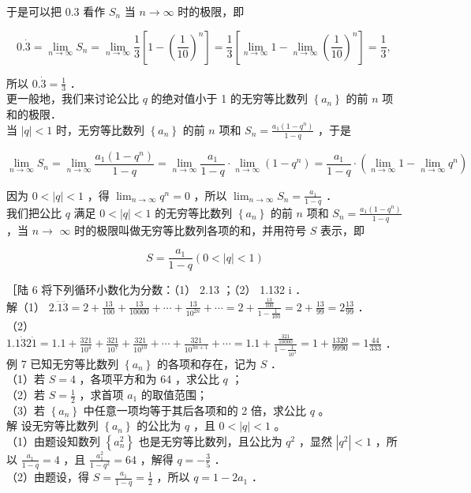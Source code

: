 \documentclass[10pt]{article}
\begin{document}
于是可以把 0.3 看作 \(S_{n}\) 当 \(n \rightarrow \infty\) 时的极限，即

\[
0 . \dot{3}=\lim _{n \rightarrow \infty} S_{n}=\lim _{n \rightarrow \infty} \frac{1}{3}\left[1-\left(\frac{1}{10}\right)^{n}\right]=\frac{1}{3}\left[\lim _{n \rightarrow \infty} 1-\lim _{n \rightarrow \infty}\left(\frac{1}{10}\right)^{n}\right]=\frac{1}{3} \text {, }
\]

所以 \(0 . \dot{3}=\frac{1}{3}\) ．\\
更一般地，我们来讨论公比 \(q\) 的绝对值小于 1 的无穷等比数列 \(\left\{a_{n}\right\}\) 的前 \(n\) 项和的极限．\\
当 \(|q|<1\) 时，无穷等比数列 \(\left\{a_{n}\right\}\) 的前 \(n\) 项和 \(S_{n}=\frac{a_{1}\left(1-q^{n}\right)}{1-q}\) ，于是

\[
\lim _{n \rightarrow \infty} S_{n}=\lim _{n \rightarrow \infty} \frac{a_{1}\left(1-q^{n}\right)}{1-q}=\lim _{n \rightarrow \infty} \frac{a_{1}}{1-q} \cdot \lim _{n \rightarrow \infty}\left(1-q^{n}\right)=\frac{a_{1}}{1-q} \cdot\left(\lim _{n \rightarrow \infty} 1-\lim _{n \rightarrow \infty} q^{n}\right)
\]

因为 \(0<|q|<1\) ，得 \(\lim _{n \rightarrow \infty} q^{n}=0\) ，所以 \(\lim _{n \rightarrow \infty} S_{n}=\frac{a_{1}}{1-q}\) ．\\
我们把公比 \(q\) 满足 \(0<|q|<1\) 的无穷等比数列 \(\left\{a_{n}\right\}\) 的前 \(n\) 项和 \(S_{n}=\frac{a_{1}\left(1-q^{n}\right)}{1-q}\) ，当 \(n \rightarrow\) \(\infty\) 时的极限叫做无穷等比数列各项的和，并用符号 \(S\) 表示，即

\[
S=\frac{a_{1}}{1-q}(0<|q|<1)
\]

［陆 6 将下列循环小数化为分数：（1） 2.13 ；（2） 1.132 i ．\\
解（1） \(2 . \ddot{1} \ddot{3}=2+\frac{13}{100}+\frac{13}{10000}+\cdots+\frac{13}{10^{2 n}}+\cdots=2+\frac{\frac{13}{100}}{1-\frac{1}{100}}=2+\frac{13}{99}=2 \frac{13}{99}\) ．\\
（2） \(1.1 \dot{3} 2 \dot{1}=1.1+\frac{321}{10^{4}}+\frac{321}{10^{7}}+\frac{321}{10^{10}}+\cdots+\frac{321}{10^{3 n+1}}+\cdots=1.1+\frac{\frac{321}{10000}}{1-\frac{1}{10^{3}}}=1+\frac{1320}{9990}=1 \frac{44}{333}\) ．\\
例 7 已知无穷等比数列 \(\left\{a_{n}\right\}\) 的各项和存在，记为 \(S\) ．\\
（1）若 \(S=4\) ，各项平方和为 64 ，求公比 \(q\) ；\\
（2）若 \(S=\frac{1}{2}\) ，求首项 \(a_{1}\) 的取值范围；\\
（3）若 \(\left\{a_{n}\right\}\) 中任意一项均等于其后各项和的 2 倍，求公比 \(q\) 。\\
解 设无穷等比数列 \(\left\{a_{n}\right\}\) 的公比为 \(q\) ，且 \(0<|q|<1\) 。\\
（1）由题设知数列 \(\left\{a_{n}^{2}\right\}\) 也是无穷等比数列，且公比为 \(q^{2}\) ，显然 \(\left|q^{2}\right|<1\) ，所以 \(\frac{a_{1}}{1-q}=4\) ，且 \(\frac{a_{1}^{2}}{1-q^{2}}=64\) ，解得 \(q=-\frac{3}{5}\) ．\\
（2）由题设，得 \(S=\frac{a_{1}}{1-q}=\frac{1}{2}\) ，所以 \(q=1-2 a_{1}\) ．
\end{document}
